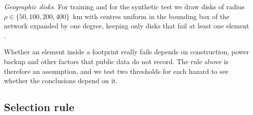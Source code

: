 \documentclass[preprint,12pt]{elsarticle}
\begin{document}
\emph{Geographic disks.} For training and for the synthetic test we draw disks of radius $\rho\in\{50,100,200,400\}$~km with centres uniform in the bounding box of the network expanded by one degree, keeping only disks that fail at least one element \cite{neumayer11}.

Whether an element inside a footprint really fails depends on construction, power backup and other factors that public data do not record. The rule above is therefore an assumption, and we test two thresholds for each hazard to see whether the conclusions depend on it.

\subsection{Selection rule}
\label{sec:rule}
\end{document}
